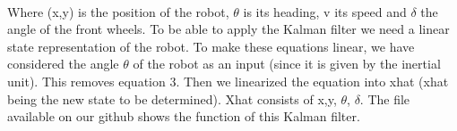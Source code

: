 \paragraph{}
Where (x,y) is the position of the robot, $\theta$ is its heading, v its speed and $\delta$ the angle of the front wheels.
To be able to apply the Kalman filter we need a linear state representation of the robot. To make these equations linear, 
we have considered the angle $\theta$ of the robot as an input (since it is given by the inertial unit). 
This removes equation 3. Then we linearized the equation into xhat (xhat being the new state to be determined). Xhat consists of x,y, $\theta$, $\delta$. 
The file  available on our github shows the function of this Kalman filter.

